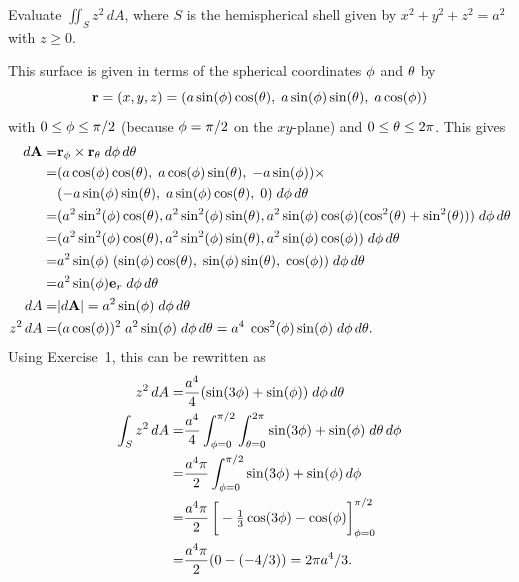 \documentclass[a4paper]{amsart}
\renewenvironment{solution}{\SolutionInline}{\endSolutionInline}
\begin{document}
\begin{exercise}
 Evaluate $\iint_S z^2\,dA$, where $S$ is the hemispherical shell
 given by $x^2+y^2+z^2=a^2$ with $z\geq 0$.
\end{exercise}
\begin{solution}
 This surface is given in terms of the spherical coordinates $\phi$
 and $\theta$ by 
 \[ \mathbf{r} = (x,y,z) =
     (a\sin(\phi)\cos(\theta),\;a\sin(\phi)\sin(\theta),\;a\cos(\phi))
 \]
 with $0\leq\phi\leq\pi/2$ (because $\phi=\pi/2$ on the $xy$-plane)
 and $0\leq\theta\leq 2\pi$.
 This gives 
 \begin{align*}
  d\mathbf{A} =& \mathbf{r}_\phi\times\mathbf{r}_\theta\;d\phi\,d\theta\\
   =&
   (a\cos(\phi)\cos(\theta),\;a\cos(\phi)\sin(\theta),\;-a\sin(\phi))\times\\
   & (-a\sin(\phi)\sin(\theta),\;a\sin(\phi)\cos(\theta),\;0)\;d\phi\,d\theta \\
   =& (a^2\sin^2(\phi)\cos(\theta),
       a^2\sin^2(\phi)\sin(\theta),
       a^2\sin(\phi)\cos(\phi)(\cos^2(\theta)+\sin^2(\theta)))\;d\phi\,d\theta \\
   =&  (a^2\sin^2(\phi)\cos(\theta),
       a^2\sin^2(\phi)\sin(\theta),
       a^2\sin(\phi)\cos(\phi))\;d\phi\,d\theta \\
   =& a^2\sin(\phi) \;
       (\sin(\phi)\cos(\theta),\;\sin(\phi)\sin(\theta),\;\cos(\phi))\;d\phi\,d\theta \\
   =& a^2\sin(\phi)\mathbf{e}_r\;d\phi\,d\theta \\
   dA =& |d\mathbf{A}| = a^2\sin(\phi)\;d\phi\,d\theta \\
   z^2\,dA =& (a\cos(\phi))^2\;a^2\sin(\phi)\;d\phi\,d\theta 
            = a^4\;\cos^2(\phi)\sin(\phi)\;d\phi\,d\theta.
 \end{align*}
 Using Exercise~1, this can be rewritten as 
 \begin{align*}
  z^2\,dA =& \frac{a^4}{4}(\sin(3\zen)+\sin(\zen))\;d\zen\,d\azi \\
   \int_S z^2\,dA =& \frac{a^4}{4}
    \int_{\zen=0}^{\pi/2}\int_{\azi=0}^{2\pi}
      \sin(3\zen)+\sin(\zen)\;d\azi\,d\zen \\
    =& \frac{a^4\pi}{2} \int_{\zen=0}^{\pi/2}
        \sin(3\zen)+\sin(\zen)\,d\zen \\
    =& \frac{a^4\pi}{2}
        \CH{-\tfrac{1}{3}\cos(3\zen)-\cos(\zen)}_{\zen=0}^{\pi/2} \\
    =& \frac{a^4\pi}{2}(0-(-4/3)) = 2\pi a^4/3.
 \end{align*}
\end{solution}
\end{document}
